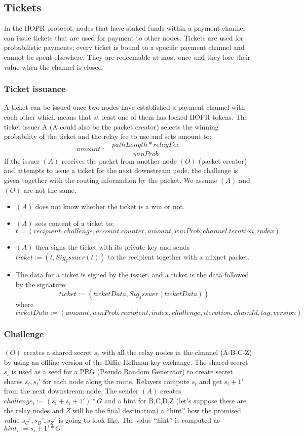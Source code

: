 \subsection{Tickets}
In the HOPR protocol, nodes that have staked funds within a payment channel can issue tickets that are used for payment to other nodes. 
Tickets are used for probabilistic payments; every ticket is bound to a specific payment channel and cannot be spent elsewhere. 
They are redeemable at most once and they lose their value when the channel is closed. 
\subsubsection{Ticket issuance}
A ticket can be issued once two nodes have established a payment channel with each other which means that at least one of them has locked HOPR tokens.
\newline The ticket issuer A (A could also be the packet creator) selects the winning probability of the ticket and the relay fee to use and sets amount to:
$$amount:=\dfrac{pathLength*relayFee}{winProb}$$
If the issuer $(A)$ receives the packet from another node $(O)$ (packet creator) and attempts to issue a ticket for the next downstream node, 
the challenge is given together with the routing information by the packet. We assume $(A)$ and $(O)$ are not the same.
\begin{itemize}
    \item[] $(A)$ does not know whether the ticket is a win or not.
    \item[] $(A)$ sets content of a ticket to: $$t=(recipient, challenge, account.counter, amount, winProb, channel.teration, index)$$ 
    \item[] $(A)$ then signs the ticket with its private key and sends $ticket:= (t, Sig_Issuer(t))$ to the recipient together with a mixnet packet.
    \item[] The data for a ticket is signed by the issuer, and a ticket is the data followed by the signature: $$ticket:=(ticketData,Sig_Issuer(ticketData))$$ where 
    $$ticketData:=(amount,winProb,recipient,index,challenge,iteration,chainId,tag,version)$$
 \end{itemize}

\subsubsection*{Challenge}
$(O)$ creates a shared secret $s_i$ with all the relay nodes in the channel (A-B-C-Z) by using an offline version of the Diffie-Hellman key exchange.
\newline The shared secret $s_i$ is used as a seed for a PRG (Pseudo Random Generator) to create secret shares $s_i,s_i'$ for each node along the route. 
Relayers compute $s_i$ and get $s_i+1'$ from the next downstream node. 
\newline The sender $(A)$ creates $challenge_i:=(s_i+s_i+1')*G$ and a hint for B,C,D,Z (let’s suppose these are the relay nodes and $Z$ will be the final destination) a “hint” how the promised value $s_C',s_D',s_Z'$ is going to look like. 
The value “hint” is computed as $hint_i:=s_i+1'*G$ 


